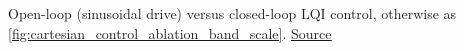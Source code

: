 Open-loop (sinusoidal drive) versus closed-loop LQI control, otherwise as \autoref{fig:cartesian_control_ablation_band_scale}. \href{https://github.com/tahmidazam/gg4/blob/main/notebooks/cartesian_control_ablation_control_mode/cartesian_control_ablation_control_mode.ipynb}{\underline{Source}}%